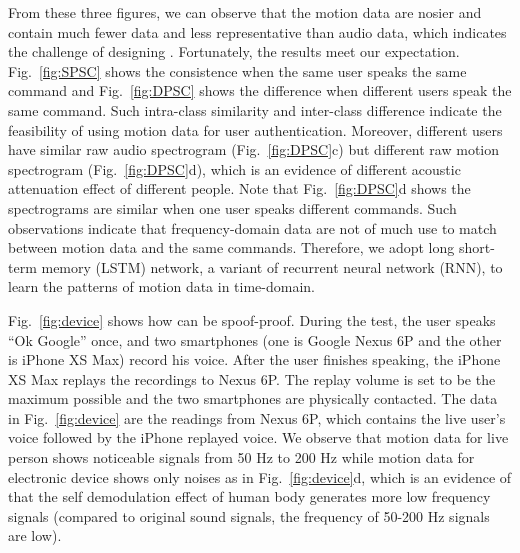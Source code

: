 %
From these three figures, we can observe that the motion data are nosier and contain much fewer data and less representative than audio data, which indicates the challenge of designing {\shortname}. Fortunately, the results meet our expectation. Fig.~\ref{fig:SPSC} shows the consistence when the same user speaks the same command and Fig.~\ref{fig:DPSC} shows the difference when different users speak the same command. Such intra-class similarity and inter-class difference indicate the feasibility of using motion data for user authentication. Moreover, different users have similar raw audio spectrogram (Fig.~\ref{fig:DPSC}c) but different raw motion spectrogram (Fig.~\ref{fig:DPSC}d), which is an evidence of different acoustic attenuation effect of different people. Note that Fig.~\ref{fig:DPSC}d shows the spectrograms are similar when one user speaks different commands.  Such observations indicate that frequency-domain data are not of much use to match between motion data and the same commands. Therefore, we adopt long short-term memory (LSTM) network, a variant of recurrent neural network (RNN), to learn the patterns of motion data in time-domain. 


Fig.~\ref{fig:device} shows how {\shortname} can be spoof-proof. During the test, the user speaks ``Ok Google'' once, and two smartphones (one is Google Nexus 6P and the other is iPhone XS Max) record his voice. After the user finishes speaking, the iPhone XS Max replays the recordings to Nexus 6P. The replay volume is set to be the maximum possible and the two smartphones are physically contacted. The data in Fig.~\ref{fig:device} are the readings from Nexus 6P, which contains the live user's voice followed by the iPhone replayed voice. We observe that motion data for live person shows noticeable signals from 50 Hz to 200 Hz while motion data for electronic device shows only noises as in Fig.~\ref{fig:device}d, which is an evidence of that the self demodulation effect of human body generates more low frequency signals (compared to original sound signals, the frequency of 50-200 Hz signals are low). 


